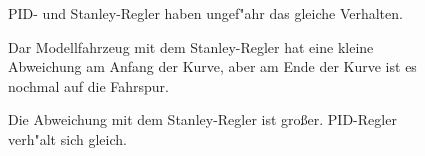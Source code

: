 \documentclass[arbeit=studie,oneside,BCOR=12mm]{ArbeitRST}
\begin{document}
\begin{figure}[h]
    \centering
    \caption{PID- und Stanley-Regler haben ungef"ahr das gleiche Verhalten.}
    \label{ab:1.25}
\end{figure}
\begin{figure}[h]
    \centering
    \caption{Dar Modellfahrzeug mit dem Stanley-Regler hat eine kleine Abweichung am Anfang der Kurve, aber 
    am Ende der Kurve ist es nochmal auf die Fahrspur.}
    \label{ab:1.5}
\end{figure}
\begin{figure}[h]
    \centering
    \caption{Die Abweichung mit dem Stanley-Regler ist gro{\ss}er. PID-Regler verh"alt sich
    gleich.}
    \label{ab:1.75}
\end{figure}
\end{document}
